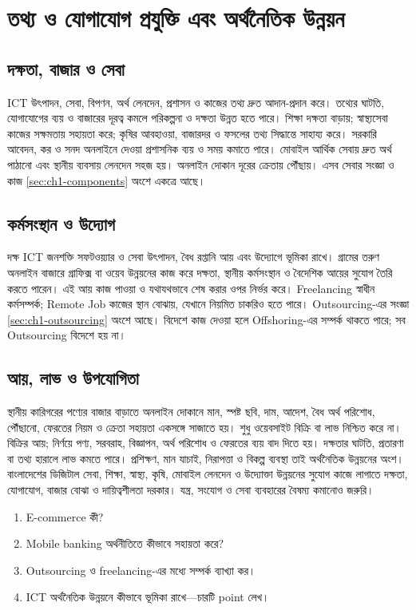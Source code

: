 \section{তথ্য ও যোগাযোগ প্রযুক্তি এবং অর্থনৈতিক উন্নয়ন}
\label{sec:ch1-economy}
\subsection{দক্ষতা, বাজার ও সেবা}
ICT উৎপাদন, সেবা, বিপণন, অর্থ লেনদেন, প্রশাসন ও কাজের তথ্য দ্রুত আদান-প্রদান করে। তথ্যের ঘাটতি, যোগাযোগের ব্যয় ও বাজারের দূরত্ব কমলে পরিকল্পনা ও দক্ষতা উন্নত হতে পারে। শিক্ষা দক্ষতা বাড়ায়; স্বাস্থ্যসেবা কাজের সক্ষমতায় সহায়তা করে; কৃষির আবহাওয়া, বাজারদর ও ফসলের তথ্য সিদ্ধান্তে সাহায্য করে।
সরকারি আবেদন, কর ও সনদ অনলাইনে দেওয়া প্রশাসনিক ব্যয় ও সময় কমাতে পারে। মোবাইল আর্থিক সেবায় দ্রুত অর্থ পাঠানো এবং স্থানীয় ব্যবসায় লেনদেন সহজ হয়। অনলাইন দোকান দূরের ক্রেতায় পৌঁছায়। এসব সেবার সংজ্ঞা ও কাজ \ref{sec:ch1-components} অংশে একত্রে আছে।
\subsection{কর্মসংস্থান ও উদ্যোগ}
দক্ষ ICT জনশক্তি সফটওয়্যার ও সেবা উৎপাদন, বৈধ রপ্তানি আয় এবং উদ্যোগে ভূমিকা রাখে। গ্রামের তরুণ অনলাইন বাজারে গ্রাফিক্স বা ওয়েব উন্নয়নের কাজ করে দক্ষতা, স্থানীয় কর্মসংস্থান ও বৈদেশিক আয়ের সুযোগ তৈরি করতে পারেন। এই আয় কাজ পাওয়া ও যথাযথভাবে শেষ করার ওপর নির্ভর করে।
Freelancing স্বাধীন কর্মসম্পর্ক; Remote Job কাজের স্থান বোঝায়, যেখানে নিয়মিত চাকরিও হতে পারে। Outsourcing-এর সংজ্ঞা \ref{sec:ch1-outsourcing} অংশে আছে। বিদেশে কাজ দেওয়া হলে Offshoring-এর সম্পর্ক থাকতে পারে; সব Outsourcing বিদেশে হয় না।
\subsection{আয়, লাভ ও উপযোগিতা}
স্থানীয় কারিগরের পণ্যের বাজার বাড়াতে অনলাইন দোকানে মান, স্পষ্ট ছবি, দাম, আদেশ, বৈধ অর্থ পরিশোধ, পৌঁছানো, ফেরতের নিয়ম ও ক্রেতা সহায়তা একসঙ্গে সাজাতে হয়। শুধু ওয়েবসাইট বিক্রি বা লাভ নিশ্চিত করে না।
 বিক্রির আয়;  নির্ণয়ে পণ্য, সরবরাহ, বিজ্ঞাপন, অর্থ পরিশোধ ও ফেরতের ব্যয় বাদ দিতে হয়। দক্ষতার ঘাটতি, প্রতারণা বা তথ্য হারালে লাভ কমতে পারে। প্রশিক্ষণ, মান যাচাই, নিরাপত্তা ও বিকল্প ব্যবস্থা তাই অর্থনৈতিক উন্নয়নের অংশ।
বাংলাদেশের ডিজিটাল সেবা, শিক্ষা, স্বাস্থ্য, কৃষি, মোবাইল লেনদেন ও উদ্যোক্তা উন্নয়নের সুযোগ কাজে লাগাতে দক্ষতা, যোগাযোগ, বাজার বোঝা ও দায়িত্বশীলতা দরকার। যন্ত্র, সংযোগ ও সেবা ব্যবহারের বৈষম্য কমানোও জরুরি।
\begin{practicebox}
\begin{enumerate}
\item E-commerce কী?
\item Mobile banking অর্থনীতিতে কীভাবে সহায়তা করে?
\item Outsourcing ও freelancing-এর মধ্যে সম্পর্ক ব্যাখ্যা কর।
\item ICT অর্থনৈতিক উন্নয়নে কীভাবে ভূমিকা রাখে—চারটি point লেখ।
\end{enumerate}
\end{practicebox}


